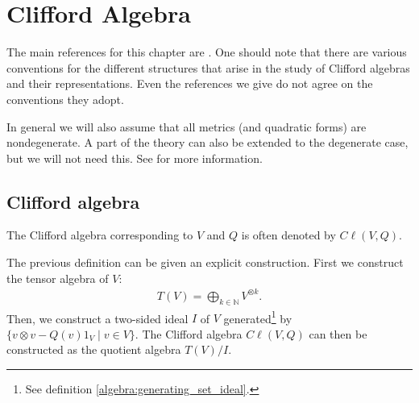 \chapter{Clifford Algebra}\label{chapter:clifford}

    The main references for this chapter are \cite{AMP1, AMP2, gallier_clifford}. One should note that there are various conventions for the different structures that arise in the study of Clifford algebras and their representations. Even the references we give do not agree on the conventions they adopt.

    In general we will also assume that all metrics (and quadratic forms) are nondegenerate. A part of the theory can also be extended to the degenerate case, but we will not need this. See \cite{gallier_clifford} for more information.

\section{Clifford algebra}

    \begin{notation}
        The Clifford algebra corresponding to $V$ and $Q$ is often denoted by $C\ell(V, Q)$.
    \end{notation}

    \begin{construct}
        The previous definition can be given an explicit construction. First we construct the tensor algebra of $V$:
        \begin{gather}
            T(V) = \bigoplus_{k\in\mathbb{N}}V^{\otimes k}.
        \end{gather}
        Then, we construct a two-sided ideal $I$ of $V$ generated\footnote{See definition \ref{algebra:generating_set_ideal}.} by $\{v\otimes v - Q(v)1_V\mid v\in V\}$. The Clifford algebra $C\ell(V, Q)$ can then be constructed as the quotient algebra $T(V)/I$.
    \end{construct}

